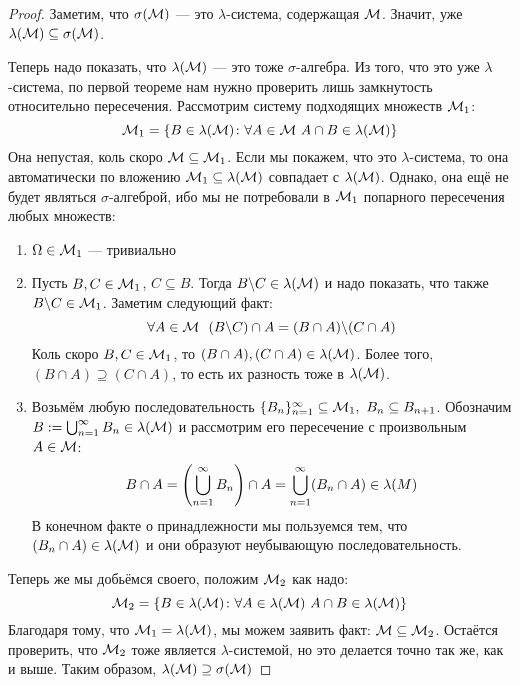 \begin{proof}
	Заметим, что $\sigma(\mathcal{M})$ --- это $\lambda$-система, содержащая $\mathcal{M}$. Значит, уже $\lambda(\mathcal{M}) \subseteq \sigma(\mathcal{M})$.
	
	Теперь надо показать, что $\lambda(\mathcal{M})$ --- это тоже $\sigma$-алгебра. Из того, что это уже $\lambda$-система, по первой теореме нам нужно проверить лишь замкнутость относительно пересечения. Рассмотрим систему подходящих множеств $\mathcal{M}_1$:
	\[
		\mathcal{M}_1 = \{B \in \lambda(\mathcal{M}) \colon \forall A \in \mathcal{M}\ A \cap B \in \lambda(\mathcal{M})\}
	\]
	Она непустая, коль скоро $\mathcal{M} \subseteq \mathcal{M}_1$. Если мы покажем, что это $\lambda$-система, то она автоматически по вложению $\mathcal{M}_1 \subseteq \lambda(\mathcal{M})$ совпадает с $\lambda(\mathcal{M})$. Однако, она ещё не будет являться $\sigma$-алгеброй, ибо мы не потребовали в $\mathcal{M}_1$ попарного пересечения любых множеств:
	\begin{enumerate}
		\item $\Omega \in \mathcal{M}_1$ --- тривиально
		
		\item Пусть $B, C \in \mathcal{M}_1$, $C \subseteq B$. Тогда $B \backslash C \in \lambda(\mathcal{M})$ и надо показать, что также $B \backslash C \in \mathcal{M}_1$. Заметим следующий факт:
		\[
			\forall A \in \mathcal{M}\ \ (B \backslash C) \cap A = (B \cap A) \backslash (C \cap A)
		\]
		Коль скоро $B, C \in \mathcal{M}_1$, то $(B \cap A), (C \cap A) \in \lambda(\mathcal{M})$. Более того, $(B \cap A) \supseteq (C \cap A)$, то есть их разность тоже в $\lambda(\mathcal{M})$.
		
		\item Возьмём любую последовательность $\{B_n\}_{n = 1}^\infty \subseteq \mathcal{M}_1,\ B_n \subseteq B_{n + 1}$. Обозначим $B := \bigcup_{n = 1}^\infty B_n \in \lambda(\mathcal{M})$ и рассмотрим его пересечение с произвольным $A \in \mathcal{M}$:
		\[
			B \cap A = \left(\bigcup_{n = 1}^\infty B_n\right) \cap A = \bigcup_{n = 1}^\infty (B_n \cap A) \in \lambda(M)
		\]
		В конечном факте о принадлежности мы пользуемся тем, что $(B_n \cap A) \in \lambda(\mathcal{M})$ и они образуют неубывающую последовательность.
	\end{enumerate}
	Теперь же мы добьёмся своего, положим $\mathcal{M}_2$ как надо:
	\[
		\mathcal{M}_2 = \{B \in \lambda(\mathcal{M}) \colon \forall A \in \lambda(\mathcal{M})\ A \cap B \in \lambda(\mathcal{M})\}
	\]
	Благодаря тому, что $\mathcal{M}_1 = \lambda(\mathcal{M})$, мы можем заявить факт: $\mathcal{M} \subseteq \mathcal{M}_2$. Остаётся проверить, что $\mathcal{M}_2$ тоже является $\lambda$-системой, но это делается точно так же, как и выше. Таким образом, $\lambda(\mathcal{M}) \supseteq \sigma(\mathcal{M})$
\end{proof}